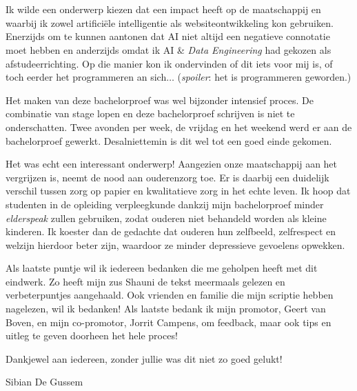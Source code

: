 
\chapter*{}
\label{ch:voorwoord}


Ik wilde een onderwerp kiezen dat een impact heeft op de maatschappij en waarbij ik zowel artificiële intelligentie als websiteontwikkeling kon gebruiken. Enerzijds om te kunnen aantonen dat AI niet altijd een negatieve connotatie moet hebben en anderzijds omdat ik AI \& \textit{Data Engineering} had gekozen als afstudeerrichting. Op die manier kon ik ondervinden of dit iets voor mij is, of toch eerder het programmeren an sich$\ldots$ (\textit{spoiler}: het is programmeren geworden.)

Het maken van deze bachelorproef was wel bijzonder intensief proces. De combinatie van stage lopen en deze bachelorproef schrijven is niet te onderschatten. Twee avonden per week, de vrijdag en het weekend werd er aan de bachelorproef gewerkt. Desalniettemin is dit wel tot een goed einde gekomen.

Het was echt een interessant onderwerp! Aangezien onze maatschappij aan het vergrijzen is, neemt de nood aan ouderenzorg toe. Er is daarbij een duidelijk verschil tussen zorg op papier en kwalitatieve zorg in het echte leven. Ik hoop dat studenten in de opleiding verpleegkunde dankzij mijn bachelorproef minder \textit{elderspeak} zullen gebruiken, zodat ouderen niet behandeld worden als kleine kinderen. Ik koester dan de gedachte dat ouderen hun zelfbeeld, zelfrespect en welzijn hierdoor beter zijn, waardoor ze minder depressieve gevoelens opwekken.

Als laatste puntje wil ik iedereen bedanken die me geholpen heeft met dit eindwerk. Zo heeft mijn zus Shauni de tekst meermaals gelezen en verbeterpuntjes aangehaald. Ook vrienden en familie die mijn scriptie hebben nagelezen, wil ik bedanken!
Als laatste bedank ik mijn promotor, Geert van Boven, en mijn co-promotor, Jorrit Campens, om feedback, maar ook tips en uitleg te geven doorheen het hele proces!

Dankjewel aan iedereen, zonder jullie was dit niet zo goed gelukt!

Sibian De Gussem
